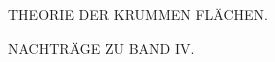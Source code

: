 %
\begin{center}
\vspace*{2in}
{\Large THEORIE DER KRUMMEN FLÄCHEN.\par}
\vspace{1cm}
NACHTRÄGE ZU BAND IV.
\end{center}
\clearpage
